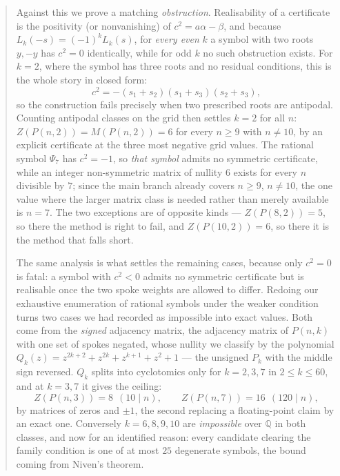\documentclass[11pt]{article}
\theoremstyle{definition}
\begin{document}
\begin{abstract}
Against this we prove a matching \emph{obstruction}. Realisability of a
certificate is the positivity (or nonvanishing) of $c^{2}=a\alpha-\beta$, and
because $L_k(-s)=(-1)^{k}L_k(s)$, for \emph{every even} $k$ a symbol with two
roots $y,-y$ has $c^{2}=0$ identically, while for odd $k$ no such obstruction
exists. For $k=2$, where the symbol has three roots and no residual conditions,
this is the whole story in closed form:
\[
  c^{2}=-(s_1+s_2)(s_1+s_3)(s_2+s_3),
\]
so the construction fails precisely when two prescribed roots are antipodal.
Counting antipodal classes on the grid then settles $k=2$ for all $n$:
$Z(P(n,2))=M(P(n,2))=6$ for every $n\ge9$ with $n\ne10$, by an explicit
certificate at the three most negative grid values. The rational symbol
$\Psi_7$ has $c^{2}=-1$, so \emph{that symbol} admits no symmetric certificate,
while an integer non-symmetric matrix of nullity $6$ exists for every $n$
divisible by $7$; since the main branch already covers $n\ge9$, $n\ne10$, the
one value where the larger matrix class is needed rather than merely available
is $n=7$.
The two exceptions are of opposite kinds --- $Z(P(8,2))=5$, so there the method
is right to fail, and $Z(P(10,2))=6$, so there it is the method that falls
short.

The same analysis is what settles the remaining cases, because only $c^{2}=0$
is fatal: a symbol with $c^{2}<0$ admits no symmetric certificate but is
realisable once the two spoke weights are allowed to differ. Redoing our
exhaustive enumeration of rational symbols under the weaker condition turns two
cases we had recorded as impossible into exact values. Both come from the
\emph{signed} adjacency matrix, the adjacency matrix of $P(n,k)$ with one set of
spokes negated, whose nullity we classify by the polynomial
$Q_k(z)=z^{2k+2}+z^{2k}+z^{k+1}+z^{2}+1$ --- the unsigned $P_k$ with the middle
sign reversed. $Q_k$ splits into cyclotomics only for $k=2,3,7$ in $2\le k\le60$,
and at $k=3,7$ it gives the ceiling:
\[
  Z(P(n,3))=8\ \ (10\mid n),\qquad Z(P(n,7))=16\ \ (120\mid n),
\]
by matrices of zeros and $\pm1$, the second replacing a floating-point claim by
an exact one. Conversely $k=6,8,9,10$ are \emph{impossible} over $\mathbb Q$ in
both classes, and now for an identified reason: every candidate clearing the
family condition is one of at most $25$ degenerate symbols, the bound coming
from Niven's theorem.


\end{abstract}
\end{document}
